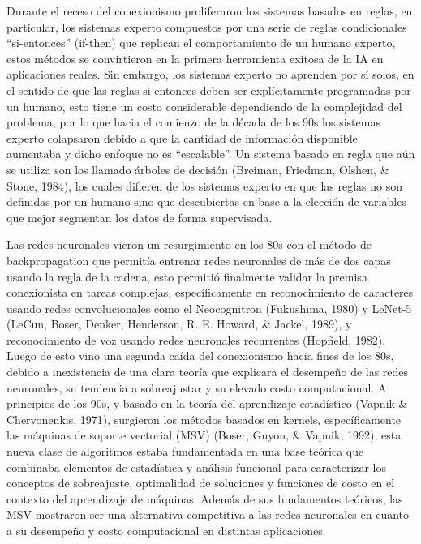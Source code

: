 Durante el receso del conexionismo proliferaron los sistemas basados en reglas, en particular, los sistemas experto compuestos por una serie de reglas condicionales “si-entonces” (if-then) que replican el comportamiento de un humano experto, estos métodos se convirtieron en la primera herramienta exitosa de la IA en aplicaciones reales. Sin embargo, los sistemas experto no aprenden por sí solos, en el sentido de que las reglas si-entonces deben ser explícitamente programadas por un humano, esto tiene un costo considerable dependiendo de la complejidad del problema, por lo que hacia el comienzo de la década de los 90s los sistemas experto colapsaron debido a que la cantidad de información disponible aumentaba y dicho enfoque no es “escalable”. Un sistema basado en regla que aún se utiliza son los llamado árboles de decisión (Breiman, Friedman, Olshen, \& Stone, 1984), los cuales difieren de los sistemas experto en que las reglas no son definidas por un humano sino que descubiertas en base a la elección de variables que mejor segmentan los datos de forma supervisada.

Las redes neuronales vieron un resurgimiento en los 80s con el método de backpropagation que permitía entrenar redes neuronales de más de dos capas usando la regla de la cadena, esto permitió finalmente validar la premisa conexionista en tareas complejas, específicamente en reconocimiento de caracteres usando redes convolucionales como el Neocognitron (Fukushima, 1980) y LeNet-5 (LeCun, Boser, Denker, Henderson, R. E. Howard, \& Jackel, 1989), y reconocimiento de voz usando redes neuronales recurrentes (Hopfield, 1982). Luego de esto vino una segunda caída del conexionismo hacia fines de los 80s, debido a inexistencia de una clara teoría que explicara el desempeño de las redes neuronales, su tendencia a sobreajustar y su elevado costo computacional. A principios de los 90s, y basado en la teoría del aprendizaje estadístico (Vapnik \& Chervonenkis, 1971), surgieron los métodos basados en kernels, específicamente las máquinas de soporte vectorial (MSV) (Boser, Guyon, \& Vapnik, 1992), esta nueva clase de algoritmos estaba fundamentada en una base teórica que combinaba elementos de estadística y análisis funcional para caracterizar los conceptos de sobreajuste, optimalidad de soluciones y funciones de costo en el contexto del aprendizaje de máquinas. Además de sus fundamentos teóricos, las MSV mostraron ser una alternativa competitiva a las redes neuronales en cuanto a su desempeño y costo computacional en distintas aplicaciones. 

